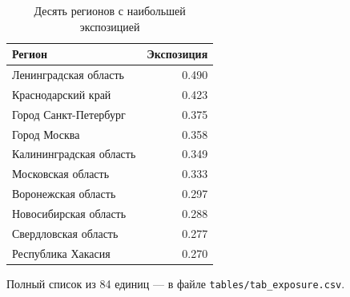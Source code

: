 \begin{table}[htbp]
\centering
\small
\caption{Десять регионов с наибольшей экспозицией}
\label{tab:exposure}
\begin{tabular}{lr}
\toprule
Регион & Экспозиция \\
\midrule
Ленинградская область & 0.490 \\
Краснодарский край & 0.423 \\
Город Санкт-Петербург & 0.375 \\
Город Москва & 0.358 \\
Калининградская область & 0.349 \\
Московская область & 0.333 \\
Воронежская область & 0.297 \\
Новосибирская область & 0.288 \\
Свердловская область & 0.277 \\
Республика Хакасия & 0.270 \\
\bottomrule
\end{tabular}
\par\smallskip\begin{minipage}{0.92\textwidth}\footnotesize
Полный список из 84 единиц — в файле \texttt{tables/tab\_exposure.csv}.
\end{minipage}
\end{table}
